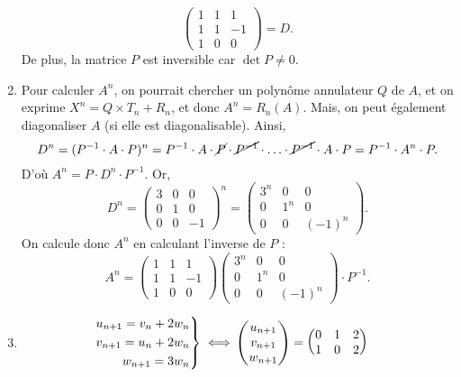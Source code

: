 \begin{exo}
\begin{enumerate}
\[\begin{pmatrix}
					1&1&1\\
					1&1&-1\\
					1&0&0
				\end{pmatrix} = D
			.\]
			De plus, la matrice $P$\/ est inversible car $\det P \neq 0$.
		\item Pour calculer $A^n$, on pourrait chercher un polynôme annulateur $Q$\/ de $A$, et on exprime $X^n = Q \times T_n + R_n$, et donc $A^n = R_n(A)$.
			Mais, on peut également diagonaliser $A$\/ (si elle est diagonalisable).
			Ainsi,  \[
				D^n = (P^{-1}\cdot A\cdot P)^n = P^{-1}\cdot A\cdot \cancel P\cdot \cancel{P^{-1}} \cdot \ldots\cdot \cancel{P^{-1}} \cdot A \cdot P = P^{-1}\cdot  A^n\cdot P
			.\] D'où $A^n = P \cdot D^n \cdot P^{-1}$. Or, \[
				D^n = \begin{pmatrix}
					3&0&0\\
					0&1&0\\
					0&0&-1
				\end{pmatrix}^n = \begin{pmatrix}
					3^n&0&0\\
					0&1^n&0\\
					0&0&(-1)^n
				\end{pmatrix}
			.\]
			On calcule donc $A^{n}$\/ en calculant l'inverse de $P$\/ : \[
				A^n = \begin{pmatrix}
					1&1&1\\
					1&1&-1\\
					1&0&0
				\end{pmatrix} \begin{pmatrix}
					3^n&0&0\\
					0&1^n&0\\
					0&0&(-1)^n
				\end{pmatrix} \cdot P^{-1}
			.\]
		\item
			\begin{align*}
				\begin{rcases*}
					\hfill u_{n+1} = v_n + 2w_n\\
					\hfill v_{n+1} = u_n + 2w_n\\
					\hfill w_{n+1} = 3w_n
				\end{rcases*} \iff& \begin{pmatrix}
					u_{n+1}\\v_{n+1}\\w_{n+1}
				\end{pmatrix} = \begin{pmatrix}
					0&1&2\\
					1&0&2\\

\end{pmatrix}
\end{align*}
\end{enumerate}
\end{exo}
